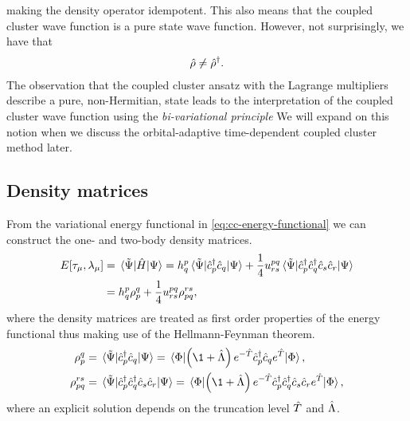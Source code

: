             making the density operator idempotent.
            This also means that the coupled cluster wave function is a pure
            state wave function.
            However, not surprisingly, we have that
            \begin{align}
                \hat{\rho} \neq \hat{\rho}^{\dagger}.
            \end{align}
            The observation that the coupled cluster ansatz with the Lagrange
            multipliers describe a pure, non-Hermitian, state leads to the
            interpretation of the coupled cluster wave function using the
            \emph{bi-variational principle} \cite{arponen1983311, lowdin-bi,
            kvaal2012ab, kvaal2013variational}
            We will expand on this notion when we discuss the orbital-adaptive
            time-dependent coupled cluster method later.

        \subsection{Density matrices}
            From the variational energy functional in
            \autoref{eq:cc-energy-functional} we can construct the one- and
            two-body density matrices.
            \begin{align}
                E[\tau_{\mu}, \lambda_{\mu}]
                &= \mel*{\tilde{\Psi}}{\hat{H}}{\Psi}
                = h^{p}_{q}
                \mel*{\tilde{\Psi}}{\hat{c}_{p}^{\dagger}\hat{c}_{q}}{\Psi}
                + \frac{1}{4}
                u^{pq}_{rs}
                \mel*{\tilde{\Psi}}{\hat{c}_{p}^{\dagger}\hat{c}_{q}^{\dagger}\hat{c}_{s}\hat{c}_{r}}{\Psi}
                \\
                &=
                h^{p}_{q} \rho^{q}_{p}
                + \frac{1}{4}
                u^{pq}_{rs}
                \rho^{rs}_{pq},
            \end{align}
            where the density matrices are treated as first order properties of
            the energy functional thus making use of the Hellmann-Feynman
            theorem.
            \begin{align}
                \densityten^{q}_{p}
                &= \mel*{\tilde{\Psi}}{\ccr{p}\can{q}}{\Psi}
                = \mel*{\slat}{
                    \para{\1 + \clustl}e^{-\clust}\ccr{p}\can{q} e^{\clust}
                }{\slat},
                \label{eq:cc-one-body-density}
                \\
                \densityten^{rs}_{pq}
                &= \mel*{\tilde{\Psi}}{
                    \ccr{p}\ccr{q}\can{s}\can{r}
                }{\Psi}
                = \mel*{\slat}{
                    \para{\1 + \clustl}e^{-\clust}
                    \ccr{p}\ccr{q}
                    \can{s}\can{r}
                    e^{\clust}
                }{\slat},
                \label{eq:cc-two-body-density}
            \end{align}
            where an explicit solution depends on the truncation level $\hat{T}$
            and $\hat{\Lambda}$.

